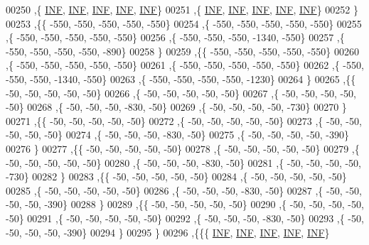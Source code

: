 \begin{DoxyCode}
00250   ,\{   \mbox{\hyperlink{energy__const_8h_a12c2040f25d8e3a7b9e1c2024c618cb6}{INF}},   \mbox{\hyperlink{energy__const_8h_a12c2040f25d8e3a7b9e1c2024c618cb6}{INF}},   \mbox{\hyperlink{energy__const_8h_a12c2040f25d8e3a7b9e1c2024c618cb6}{INF}},   \mbox{\hyperlink{energy__const_8h_a12c2040f25d8e3a7b9e1c2024c618cb6}{INF}},   \mbox{\hyperlink{energy__const_8h_a12c2040f25d8e3a7b9e1c2024c618cb6}{INF}}\}
00251   ,\{   \mbox{\hyperlink{energy__const_8h_a12c2040f25d8e3a7b9e1c2024c618cb6}{INF}},   \mbox{\hyperlink{energy__const_8h_a12c2040f25d8e3a7b9e1c2024c618cb6}{INF}},   \mbox{\hyperlink{energy__const_8h_a12c2040f25d8e3a7b9e1c2024c618cb6}{INF}},   \mbox{\hyperlink{energy__const_8h_a12c2040f25d8e3a7b9e1c2024c618cb6}{INF}},   \mbox{\hyperlink{energy__const_8h_a12c2040f25d8e3a7b9e1c2024c618cb6}{INF}}\}
00252   \}
00253  ,\{\{  -550,  -550,  -550,  -550,  -550\}
00254   ,\{  -550,  -550,  -550,  -550,  -550\}
00255   ,\{  -550,  -550,  -550,  -550,  -550\}
00256   ,\{  -550,  -550,  -550, -1340,  -550\}
00257   ,\{  -550,  -550,  -550,  -550,  -890\}
00258   \}
00259  ,\{\{  -550,  -550,  -550,  -550,  -550\}
00260   ,\{  -550,  -550,  -550,  -550,  -550\}
00261   ,\{  -550,  -550,  -550,  -550,  -550\}
00262   ,\{  -550,  -550,  -550, -1340,  -550\}
00263   ,\{  -550,  -550,  -550,  -550, -1230\}
00264   \}
00265  ,\{\{   -50,   -50,   -50,   -50,   -50\}
00266   ,\{   -50,   -50,   -50,   -50,   -50\}
00267   ,\{   -50,   -50,   -50,   -50,   -50\}
00268   ,\{   -50,   -50,   -50,  -830,   -50\}
00269   ,\{   -50,   -50,   -50,   -50,  -730\}
00270   \}
00271  ,\{\{   -50,   -50,   -50,   -50,   -50\}
00272   ,\{   -50,   -50,   -50,   -50,   -50\}
00273   ,\{   -50,   -50,   -50,   -50,   -50\}
00274   ,\{   -50,   -50,   -50,  -830,   -50\}
00275   ,\{   -50,   -50,   -50,   -50,  -390\}
00276   \}
00277  ,\{\{   -50,   -50,   -50,   -50,   -50\}
00278   ,\{   -50,   -50,   -50,   -50,   -50\}
00279   ,\{   -50,   -50,   -50,   -50,   -50\}
00280   ,\{   -50,   -50,   -50,  -830,   -50\}
00281   ,\{   -50,   -50,   -50,   -50,  -730\}
00282   \}
00283  ,\{\{   -50,   -50,   -50,   -50,   -50\}
00284   ,\{   -50,   -50,   -50,   -50,   -50\}
00285   ,\{   -50,   -50,   -50,   -50,   -50\}
00286   ,\{   -50,   -50,   -50,  -830,   -50\}
00287   ,\{   -50,   -50,   -50,   -50,  -390\}
00288   \}
00289  ,\{\{   -50,   -50,   -50,   -50,   -50\}
00290   ,\{   -50,   -50,   -50,   -50,   -50\}
00291   ,\{   -50,   -50,   -50,   -50,   -50\}
00292   ,\{   -50,   -50,   -50,  -830,   -50\}
00293   ,\{   -50,   -50,   -50,   -50,  -390\}
00294   \}
00295  \}
00296 ,\{\{\{   \mbox{\hyperlink{energy__const_8h_a12c2040f25d8e3a7b9e1c2024c618cb6}{INF}},   \mbox{\hyperlink{energy__const_8h_a12c2040f25d8e3a7b9e1c2024c618cb6}{INF}},   \mbox{\hyperlink{energy__const_8h_a12c2040f25d8e3a7b9e1c2024c618cb6}{INF}},   \mbox{\hyperlink{energy__const_8h_a12c2040f25d8e3a7b9e1c2024c618cb6}{INF}},   \mbox{\hyperlink{energy__const_8h_a12c2040f25d8e3a7b9e1c2024c618cb6}{INF}}\}

\end{DoxyCode}
